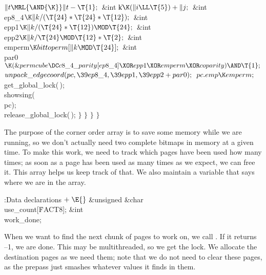 ${}\|t\MRL{\AND{\K}}\|t-\T{1};{}$\7
\&{int} \|k${}\K(\|i\LL\T{5})+\|j;{}$\6
\&{int} \\{ep8\_4}${}\K\|k/(\T{24}*\T{24}*\T{12});{}$\6
\&{int} \\{epp1}${}\K\|k/(\T{24}*\T{12})\MOD\T{24};{}$\6
\&{int} \\{epp2}${}\K\|k/\T{24}\MOD\T{12}*\T{2};{}$\6
\&{int} \\{emperm}${}\K\\{bittoperm}[\|k\MOD\T{24}];{}$\6
\&{int} \\{par0}${}\K(\&{permcube}\DC\\{c8\_4\_parity}[\\{ep8\_4}]\XOR\\{epp1}%
\XOR\\{emperm}\XOR\\{coparity})\AND\T{1};{}$\7
${}\\{unpack\_edgecoord}(\\{pc},\39\\{ep8\_4},\39\\{epp1},\39\\{epp2}+%
\\{par0});{}$\6
${}\\{pc}.\\{emp}\K\\{emperm};{}$\6
\\{get\_global\_lock}(\,);\6
\\{showsing}(\\{pc});\6
\\{release\_global\_lock}(\,);\6
\4${}\}{}$\2\6
\4${}\}{}$\2\6
\4${}\}{}$\2\6
\4${}\}{}$\2\par
\fi

The purpose of the corner order array is to save some memory
while we are running, so we don't actually need two complete
bitmaps in memory at a given time.  To make this work, we need
to track which pages have been used how many times; as soon
as a page has been used as many times as we expect, we can
free it.  This array helps us keep track of that.  We also
maintain a variable that says where we are in the
 array.

\Y\B\4:Data declarations\X${}\mathrel+\E{}$\6
\&{unsigned} \&{char} \\{use\_count}[\.{FACT8}];\6
\&{int} \\{work\_done};\par
\fi

When we want to find the next chunk of pages to work on, we
call .  If it returns --1, we are done.
This may be multithreaded, so we get the lock.  We allocate
the destination pages as we need them; note that we do not
need to clear these pages, as the prepass just smashes whatever
values it finds in them.

